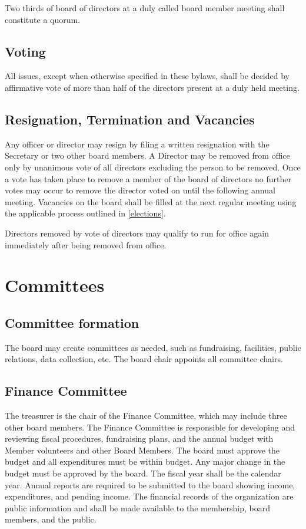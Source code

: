 \documentclass[10pt,letterpaper,titlepage]{article}
\begin{document}
Two thirds of board of directors at a duly called board member meeting shall
constitute a quorum.

\subsection{Voting}

All issues, except when otherwise specified in these bylaws, shall be decided
by affirmative vote of more than half of the directors present at a duly held
meeting.

\subsection{Resignation, Termination and Vacancies}

Any officer or director may resign by filing a written resignation with the
Secretary or two other board members.
A Director may be removed from office only by unanimous vote of all directors
excluding the person to be removed.
Once a vote has taken place to remove a member of the board of directors no
further votes may occur to remove the director voted on until the following
annual meeting.
Vacancies on the board shall be filled at the next regular meeting using the
applicable process outlined in \ref{elections}.

Directors removed by vote of directors may qualify to run for office again
immediately after being removed from office.

\section{Committees}

\subsection{Committee formation}

The board may create committees as needed, such as fundraising, facilities,
public relations, data collection, etc.
The board chair appoints all committee chairs.

\subsection{Finance Committee}

The treasurer is the chair of the Finance Committee, which may include three
other board members.
The Finance Committee is responsible for developing and reviewing fiscal
procedures, fundraising plans, and the annual budget with Member volunteers and
other Board Members.
The board must approve the budget and all expenditures must be within budget.
Any major change in the budget must be approved by the board.
The fiscal year shall be the calendar year.
Annual reports are required to be submitted to the board showing income,
expenditures, and pending income.
The financial records of the organization are public information and shall be
made available to the membership, board members, and the public.
\end{document}
